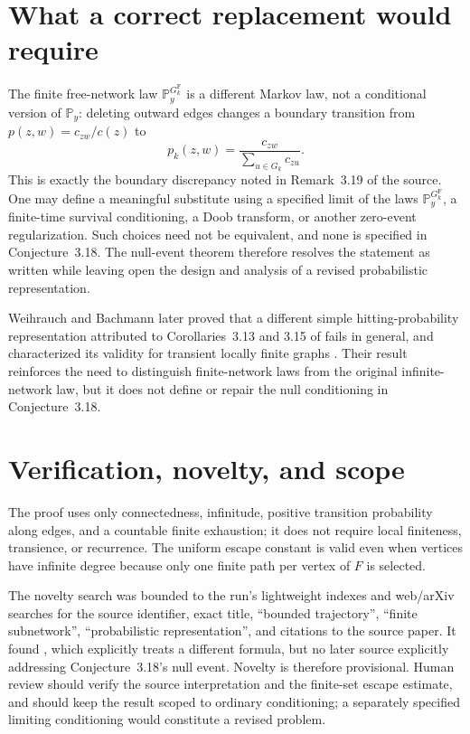 \documentclass[11pt]{article}
\newcommand{\PP}{\mathbb P}
\begin{document}
\section{What a correct replacement would require}

The finite free-network law $\PP_y^{G_k^{\mathrm F}}$ is a different Markov
law, not a conditional version of $\PP_y$: deleting outward edges changes a
boundary transition from $p(z,w)=c_{zw}/c(z)$ to
\[
 p_k(z,w)=\frac{c_{zw}}{\sum_{u\in G_k}c_{zu}}.
\]
This is exactly the boundary discrepancy noted in Remark~3.19 of the source.
One may define a meaningful substitute using a specified limit of the laws
$\PP_y^{G_k^{\mathrm F}}$, a finite-time survival conditioning, a Doob
transform, or another zero-event regularization.  Such choices need not be
equivalent, and none is specified in Conjecture~3.18.  The null-event theorem
therefore resolves the statement as written while leaving open the design and
analysis of a revised probabilistic representation.

Weihrauch and Bachmann later proved that a different simple hitting-probability
representation attributed to Corollaries~3.13 and 3.15 of \cite{JP} fails in
general, and characterized its validity for transient locally finite graphs
\cite{WB}.  Their result reinforces the need to distinguish finite-network
laws from the original infinite-network law, but it does not define or repair
the null conditioning in Conjecture~3.18.

\section*{Verification, novelty, and scope}

The proof uses only connectedness, infinitude, positive transition
probability along edges, and a countable finite exhaustion; it does not
require local finiteness, transience, or recurrence.  The uniform escape
constant is valid even when vertices have infinite degree because only one
finite path per vertex of $F$ is selected.

The novelty search was bounded to the run's lightweight indexes and web/arXiv
searches for the source identifier, exact title, ``bounded trajectory'',
``finite subnetwork'', ``probabilistic representation'', and citations to the
source paper.  It found \cite{WB}, which explicitly treats a different formula,
but no later source explicitly addressing Conjecture~3.18's null event.
Novelty is therefore provisional.  Human review should verify the source
interpretation and the finite-set escape estimate, and should keep the result
scoped to ordinary conditioning; a separately specified limiting
conditioning would constitute a revised problem.
\end{document}
